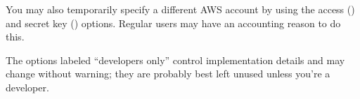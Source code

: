 
You may also temporarily specify a different AWS account by using the
access () and
secret key () options.  Regular users may have
an accounting reason to do this.

The options labeled ``developers only'' control implementation details and
may change without warning; they are probably best left unused unless you're
a developer.

